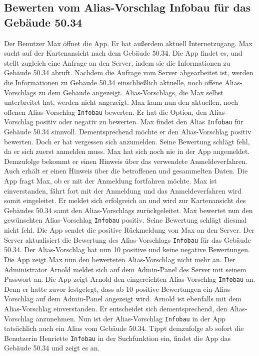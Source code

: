 \subsection{Bewerten vom \Gls{Alias-Vorschlag} Infobau für das Gebäude 50.34}

Der Benutzer Max öffnet die App.
Er hat außerdem aktuell Internetzugang.
Max sucht auf der \Gls{Kartenansicht} nach dem Gebäude 50.34.
Die App findet es, und stellt zugleich eine Anfrage an den \Gls{Server}, indem sie die Informationen zu Gebäude 50.34 abruft.
Nachdem die Anfrage vom \Gls{Server} abgearbeitet ist, werden die Informationen zu Gebäude 50.34 einschließlich aktuelle, noch offene \Glspl{Alias-Vorschlag} zu dem Gebäude angezeigt.
\Glspl{Alias-Vorschlag}, die Max selbst unterbreitet hat, werden nicht angezeigt.
Max kann nun den aktuellen, noch offenen \Gls{Alias-Vorschlag} \texttt{Infobau} bewerten.
Er hat die Option, den \Gls{Alias-Vorschlag} positiv oder negativ zu bewerten.
Max findet den \Gls{Alias} \texttt{Infobau} für Gebäude 50.34 sinnvoll.
Dementsprechend möchte er den \Gls{Alias-Vorschlag} positiv bewerten.
Doch er hat vergessen sich anzumelden.
Seine Bewertung schlägt fehl, da er sich zuerst anmelden muss.
Max hat sich noch nie in der App angemeldet.
Demzufolge bekommt er einen Hinweis über das verwendete Anmeldeverfahren.
Auch erhält er einen Hinweis über die betroffenen und gesammelten Daten.
Die App fragt Max, ob er mit der Anmeldung fortfahren möchte.
Max ist einverstanden, fährt fort mit der Anmeldung und das Anmeldeverfahren wird somit eingeleitet.
Er meldet sich erfolgreich an und wird zur \Gls{Kartenansicht} des Gebäudes 50.34 samt den \Glspl{Alias-Vorschlag} zurückgeleitet.
Max bewertet nun den gewünschten \Gls{Alias-Vorschlag} \texttt{Infobau} positiv.
Seine Bewertung schlägt diesmal nicht fehl.
Die App sendet die positive Rückmeldung von Max an den \Gls{Server}.
Der \Gls{Server} aktualisiert die Bewertung des \Gls{Alias-Vorschlag}s \texttt{Infobau} für das Gebäude 50.34.
Der \Gls{Alias-Vorschlag} hat nun 10 positive und keine negative Bewertungen.
Die App zeigt Max nun den bewerteten \Gls{Alias-Vorschlag} nicht mehr an.
Der Administrator Arnold meldet sich auf dem \Gls{Admin-Panel} des \Gls{Server} mit seinem Passwort an.
Die App zeigt Arnold den eingereichten \Gls{Alias-Vorschlag} \texttt{Infobau} an.
Denn er hatte zuvor festgelegt, dass ab 10 positive Bewertungen ein \Gls{Alias-Vorschlag} auf dem \Gls{Admin-Panel} angezeigt wird.
Arnold ist ebenfalls mit dem \Gls{Alias-Vorschlag} einverstanden.
Er entscheidet sich dementsprechend, den \Gls{Alias-Vorschlag} anzunehmen.
Nun ist der \Gls{Alias-Vorschlag} \texttt{Infobau} in der App tatsächlich auch ein \Gls{Alias} vom Gebäude 50.34.
Tippt demzufolge ab sofort die Benutzerin Henriette \texttt{Infobau} in der Suchfunktion ein, findet die App das Gebäude 50.34 und zeigt es an.

